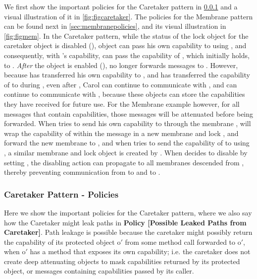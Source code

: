 \documentclass[a4paper,11pt,twoside]{article}
\begin{document}
{We first show the important policies for the Caretaker pattern in \cref{sec:caretakerpolicies} and a visual illustration of it in \cref{fig:figcaretaker}. The policies for the Membrane pattern can be found next in \cref{sec:membranepolicies}, and its visual illustration in \cref{fig:figmem}. In the Caretaker pattern, while the status of the lock object  for the caretaker object  is disabled (), object  can pass his own capability to  using , and consequently, with 's capability,  can pass the capability of , which  initially holds, to . \textit{After} the  object is enabled (),  no longer forwards messages to . However, because  has transferred his own capability to , and  has transferred the capability of  to  during , even after , Carol can continue to communicate with , and  can continue to communicate with , because these objects can store the capabilities they have received for future use. For the Membrane example however, for all messages that contain capabilities, those messages will be attenuated before being forwarded. When  tries to send his own capability to  through the membrane ,  will wrap the capability of  within the message in a new membrane  and lock , and forward the new membrane   to , and when  tries to send the capability of  to  using , a similar membrane  and lock object is created by . When  decides to disable  by setting , the disabling action can propagate to all membranes descended from , thereby preventing communication from  to  and  to .

\clearpage
\subsubsection{Caretaker Pattern - Policies}\label{sec:caretakerpolicies}
Here we show the important policies for the Caretaker pattern, where we also say how the Caretaker might leak paths in \textbf{Policy [Possible Leaked Paths from Caretaker]}. Path leakage is possible because the caretaker might possibly return the capability of its protected object o$'$ from some method call forwarded to o$'$, when o$'$ has a method that exposes its own capability; i.e. the caretaker does not create deep attenuating objects to mask capabilities returned by its protected object, or messages containing capabilities passed by its caller.\\

}
\end{document}

